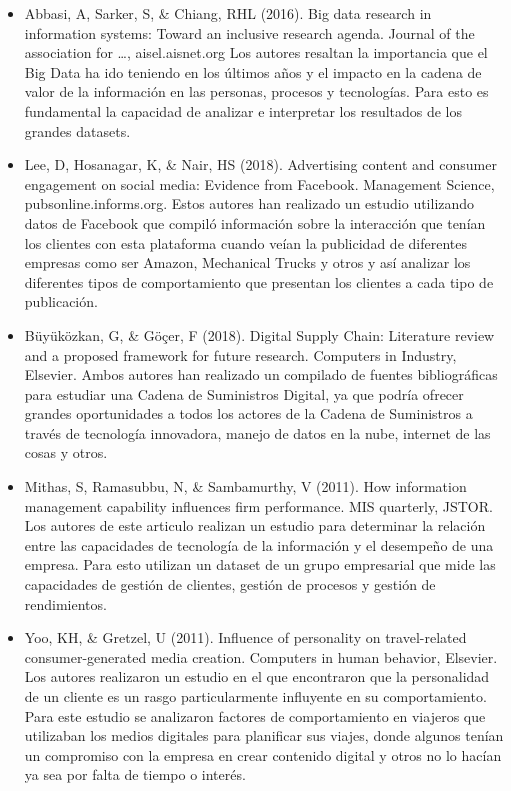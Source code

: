 \documentclass[Iberoamerican Journal of Industrial
Engineering,article,submit,moreauthors,pdftex]{Definitions/mdpi}
\begin{document}
\begin{itemize}
\item
  Abbasi, A, Sarker, S, \& Chiang, RHL (2016). Big data research in
  information systems: Toward an inclusive research agenda. Journal of
  the association for \ldots, aisel.aisnet.org Los autores resaltan la
  importancia que el Big Data ha ido teniendo en los últimos años y el
  impacto en la cadena de valor de la información en las personas,
  procesos y tecnologías. Para esto es fundamental la capacidad de
  analizar e interpretar los resultados de los grandes datasets.
\item
  Lee, D, Hosanagar, K, \& Nair, HS (2018). Advertising content and
  consumer engagement on social media: Evidence from Facebook.
  Management Science, pubsonline.informs.org. Estos autores han
  realizado un estudio utilizando datos de Facebook que compiló
  información sobre la interacción que tenían los clientes con esta
  plataforma cuando veían la publicidad de diferentes empresas como ser
  Amazon, Mechanical Trucks y otros y así analizar los diferentes tipos
  de comportamiento que presentan los clientes a cada tipo de
  publicación.
\item
  Büyüközkan, G, \& Göçer, F (2018). Digital Supply Chain: Literature
  review and a proposed framework for future research. Computers in
  Industry, Elsevier. Ambos autores han realizado un compilado de
  fuentes bibliográficas para estudiar una Cadena de Suministros
  Digital, ya que podría ofrecer grandes oportunidades a todos los
  actores de la Cadena de Suministros a través de tecnología innovadora,
  manejo de datos en la nube, internet de las cosas y otros.
\item
  Mithas, S, Ramasubbu, N, \& Sambamurthy, V (2011). How information
  management capability influences firm performance. MIS quarterly,
  JSTOR. Los autores de este articulo realizan un estudio para
  determinar la relación entre las capacidades de tecnología de la
  información y el desempeño de una empresa. Para esto utilizan un
  dataset de un grupo empresarial que mide las capacidades de gestión de
  clientes, gestión de procesos y gestión de rendimientos.
\item
  Yoo, KH, \& Gretzel, U (2011). Influence of personality on
  travel-related consumer-generated media creation. Computers in human
  behavior, Elsevier. Los autores realizaron un estudio en el que
  encontraron que la personalidad de un cliente es un rasgo
  particularmente influyente en su comportamiento. Para este estudio se
  analizaron factores de comportamiento en viajeros que utilizaban los
  medios digitales para planificar sus viajes, donde algunos tenían un
  compromiso con la empresa en crear contenido digital y otros no lo
  hacían ya sea por falta de tiempo o interés.
\end{itemize}
\end{document}

